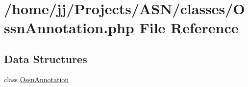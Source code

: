\hypertarget{_ossn_annotation_8php}{}\section{/home/jj/\+Projects/\+A\+S\+N/classes/\+Ossn\+Annotation.php File Reference}
\label{_ossn_annotation_8php}
\subsection*{Data Structures}
\begin{DoxyCompactItemize}
\item 
class \hyperlink{class_ossn_annotation}{Ossn\+Annotation}
\end{DoxyCompactItemize}
